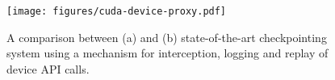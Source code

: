 \begin{figure}[t]
    \centering
    \texttt{[image: figures/cuda-device-proxy.pdf]}
    \caption{A comparison between (a) \sys and (b) state-of-the-art checkpointing system using a mechanism for interception, logging and replay of device API calls.}
    \label{fig:cuda-device-proxy}
\end{figure}